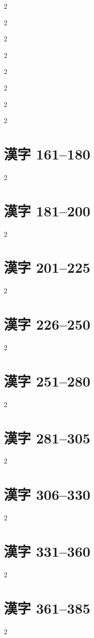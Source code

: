 \documentclass[10pt, a4paper]{ltjbook}
\begin{document}
\begin{multicols}{2}
\begin{multicols}{2}
\begin{multicols}{2}
\begin{multicols}{2}
\begin{multicols}{2}
\begin{multicols}{2}
\begin{multicols}{2}
\begin{multicols}{2}
\chapter{漢字 161--180}
\begin{multicols}{2}


\chapter{漢字 181--200}
\begin{multicols}{2}


\chapter{漢字 201--225}
\begin{multicols}{2}


\chapter{漢字 226--250}
\begin{multicols}{2}


\chapter{漢字 251--280}
\begin{multicols}{2}


\chapter{漢字 281--305}
\begin{multicols}{2}


\chapter{漢字 306--330}
\begin{multicols}{2}


\chapter{漢字 331--360}
\begin{multicols}{2}


\chapter{漢字 361--385}
\begin{multicols}{2}



\end{multicols}
\end{multicols}
\end{multicols}
\end{multicols}
\end{multicols}
\end{multicols}
\end{multicols}
\end{multicols}
\end{multicols}
\end{multicols}
\end{multicols}
\end{multicols}
\end{multicols}
\end{multicols}
\end{multicols}
\end{multicols}
\end{multicols}
\end{document}
